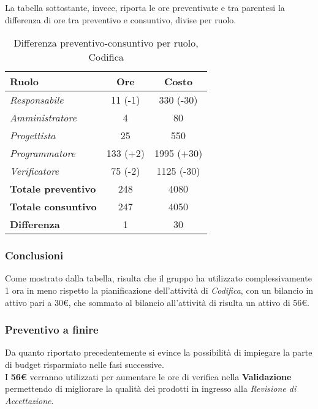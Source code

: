 La tabella sottostante, invece, riporta le ore preventivate e  tra parentesi la differenza di ore tra preventivo e consuntivo, divise per ruolo.

\begin{table}[H]
	\begin{center}
		\begin{tabular}{|l|c|c|}
			\hline
			\textbf{Ruolo}	& \textbf{Ore} & \textbf{Costo} 		\\
			\hline
			\textit{Responsabile}		&	11 (-1)	&	330 (-30)	\\
			\hline
			\textit{Amministratore}		&	4		&	80			\\
			\hline
			\textit{Progettista}		&	25		&	550			\\
			\hline
			\textit{Programmatore}		&	133	(+2)&	1995 (+30)	\\
			\hline
			\textit{Verificatore}		&	75	(-2)&	1125 (-30)	\\
			\hline
			\textbf{Totale preventivo}	&	248		& 	4080		\\
			\hline
			\textbf{Totale consuntivo}	&	247		&  	4050		\\
			\hline
			\textbf{Differenza} 		&	1		&	30			\\
			\hline
		\end{tabular}
	\end{center}
	\caption{Differenza preventivo-consuntivo per ruolo, Codifica}
\end{table}

\subsubsection{Conclusioni}
Come mostrato dalla tabella, risulta che il gruppo ha utilizzato complessivamente 1 ora in meno rispetto la pianificazione dell'attività di \textit{Codifica}, con un bilancio in attivo pari a 30€, che sommato al bilancio all'attività di \textit{\PD} risulta un attivo di 56€.

\subsubsection{Preventivo a finire}
Da quanto riportato precedentemente si evince la possibilità di impiegare la parte di budget risparmiato nelle fasi successive. \\
I \textbf{56€} verranno utilizzati per aumentare le ore di verifica nella \textbf{Validazione} permettendo di migliorare la qualità dei prodotti in ingresso alla \textit{Revisione di Accettazione}.

